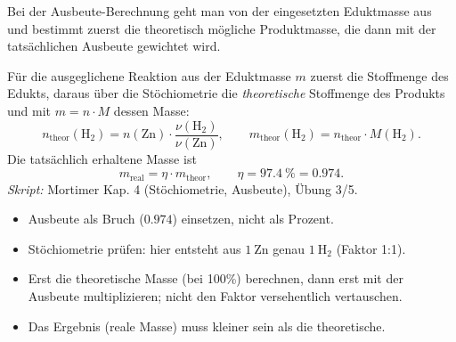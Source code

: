 

Bei der Ausbeute-Berechnung geht man von der eingesetzten Eduktmasse aus und
bestimmt zuerst die theoretisch mögliche Produktmasse, die dann mit der
tatsächlichen Ausbeute gewichtet wird.

\begin{werkzeugkasten}
Für die ausgeglichene Reaktion aus der Eduktmasse $m$ zuerst die Stoffmenge
des Edukts, daraus über die Stöchiometrie die \emph{theoretische} Stoffmenge
des Produkts und mit $m=n\cdot M$ dessen Masse:
\begin{equation}
  n_{\text{theor}}(\mathrm{H_2}) = n(\mathrm{Zn})\cdot
  \frac{\nu(\mathrm{H_2})}{\nu(\mathrm{Zn})}, \qquad
  m_{\text{theor}}(\mathrm{H_2}) = n_{\text{theor}}\cdot M(\mathrm{H_2}).
\end{equation}
Die tatsächlich erhaltene Masse ist
\begin{equation}
  m_{\text{real}} = \eta\cdot m_{\text{theor}},
  \qquad \eta = \qty{97.4}{\percent} = 0.974.
\end{equation}
\textit{Skript:} Mortimer Kap. 4 (Stöchiometrie, Ausbeute), Übung 3/5.
\end{werkzeugkasten}

\begin{achtung}
\begin{itemize}
  \item Ausbeute als Bruch ($0.974$) einsetzen, nicht als Prozent.
  \item Stöchiometrie prüfen: hier entsteht aus $1\ \mathrm{Zn}$ genau
        $1\ \mathrm{H_2}$ (Faktor 1:1).
  \item Erst die theoretische Masse (bei 100\%) berechnen, dann erst mit der
        Ausbeute multiplizieren; nicht den Faktor versehentlich vertauschen.
  \item Das Ergebnis (reale Masse) muss kleiner sein als die theoretische.
\end{itemize}
\end{achtung}
